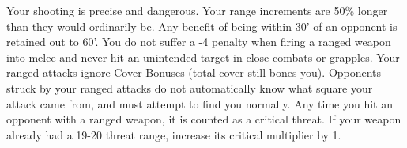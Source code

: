 {Your shooting is precise and dangerous.}
{Your range increments are 50\% longer than they would ordinarily be. Any benefit of being within 30' of an opponent is retained out to 60'.}
{You do not suffer a -4 penalty when firing a ranged weapon into melee and never hit an unintended target in close combats or grapples.}
{Your ranged attacks ignore Cover Bonuses (total cover still bones you).}
{Opponents struck by your ranged attacks do not automatically know what square your attack came from, and must attempt to find you normally.}
{Any time you hit an opponent with a ranged weapon, it is counted as a critical threat. If your weapon already had a 19-20 threat range, increase its critical multiplier by 1.}